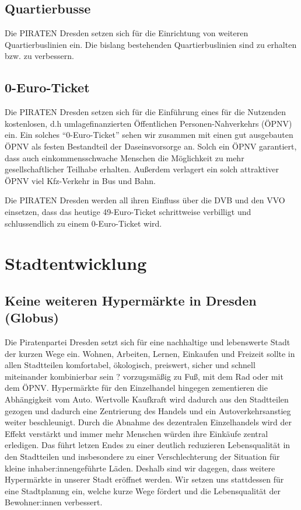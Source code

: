 \documentclass[a4paper, 11pt]{article}
\begin{document}
\subsection{Quartierbusse}
Die PIRATEN Dresden setzen sich für die Einrichtung von weiteren Quartierbuslinien ein. Die bislang bestehenden Quartierbuslinien sind zu erhalten bzw. zu verbessern.



\subsection{0-Euro-Ticket}
Die PIRATEN Dresden setzen sich für die Einführung eines für die Nutzenden kostenlosen, d.h umlagefinanzierten Öffentlichen Personen-Nahverkehrs (ÖPNV) ein. Ein solches ``0-Euro-Ticket'' sehen wir zusammen mit einen gut ausgebauten ÖPNV als festen Bestandteil der Daseinsvorsorge an. Solch ein ÖPNV garantiert, dass auch einkommensschwache Menschen die Möglichkeit zu mehr gesellschaftlicher Teilhabe erhalten. Außerdem verlagert ein solch attraktiver ÖPNV viel Kfz-Verkehr in Bus und Bahn.\newline

Die PIRATEN Dresden werden all ihren Einfluss über die DVB und den VVO einsetzen, dass das heutige 49-Euro-Ticket schrittweise verbilligt und schlussendlich zu einem 0-Euro-Ticket wird.


\section{Stadtentwicklung}

\subsection{Keine weiteren Hypermärkte in Dresden (Globus)}

Die Piratenpartei Dresden setzt sich für eine nachhaltige und lebenswerte Stadt der kurzen Wege ein. Wohnen, Arbeiten, Lernen, Einkaufen und Freizeit sollte in allen Stadtteilen komfortabel, ökologisch, preiswert, sicher und schnell miteinander kombinierbar sein ? vorzugsmäßig zu Fuß, mit dem Rad oder mit dem ÖPNV. Hypermärkte für den Einzelhandel hingegen zementieren die Abhängigkeit vom Auto. Wertvolle Kaufkraft wird dadurch aus den Stadtteilen gezogen und dadurch eine Zentrierung des Handels und ein Autoverkehrsanstieg weiter beschleunigt. Durch die Abnahme des dezentralen Einzelhandels wird der Effekt verstärkt und immer mehr Menschen würden ihre Einkäufe zentral erledigen. Das führt letzen Endes zu einer deutlich reduzieren Lebensqualität in den Stadtteilen und insbesondere zu einer Verschlechterung der Situation für kleine inhaber:innengeführte Läden. Deshalb sind wir dagegen, dass weitere Hypermärkte in unserer Stadt eröffnet werden. Wir setzen uns stattdessen für eine Stadtplanung ein, welche kurze Wege fördert und die Lebensqualität der Bewohner:innen verbessert. \newline
\end{document}
